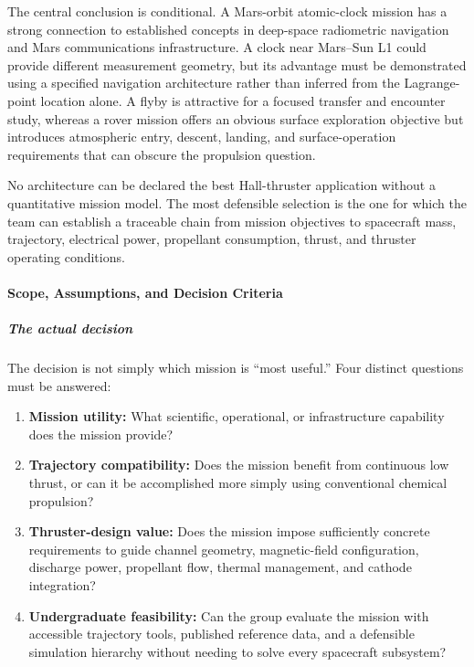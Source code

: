 The central conclusion is conditional. A Mars-orbit atomic-clock
mission has a strong connection to established concepts in deep-space
radiometric navigation and Mars communications infrastructure.
A clock near Mars--Sun L1 could provide different measurement
geometry, but its advantage must be demonstrated using a specified
navigation architecture rather than inferred from the Lagrange-point
location alone. A flyby is attractive for a focused transfer and
encounter study, whereas a rover mission offers an obvious surface
exploration objective but introduces atmospheric entry, descent,
landing, and surface-operation requirements that can obscure the
propulsion question.

No architecture can be declared the best Hall-thruster application
without a quantitative mission model. The most defensible selection
is the one for which the team can establish a traceable chain from
mission objectives to spacecraft mass, trajectory, electrical power,
propellant consumption, thrust, and thruster operating conditions.


\paragraph{Scope, Assumptions, and Decision Criteria}

\subparagraph{The actual decision}

The decision is not simply which mission is ``most useful.'' Four
distinct questions must be answered:

\begin{enumerate}
	\item \textbf{Mission utility:} What scientific, operational,
	      or infrastructure capability does the mission provide?

	\item \textbf{Trajectory compatibility:} Does the mission
	      benefit from continuous low thrust, or can it be accomplished
	      more simply using conventional chemical propulsion?

	\item \textbf{Thruster-design value:} Does the mission impose
	      sufficiently concrete requirements to guide channel geometry,
	      magnetic-field configuration, discharge power, propellant flow,
	      thermal management, and cathode integration?

	\item \textbf{Undergraduate feasibility:} Can the group evaluate
	      the mission with accessible trajectory tools, published
	      reference data, and a defensible simulation hierarchy without
	      needing to solve every spacecraft subsystem?
\end{enumerate}

